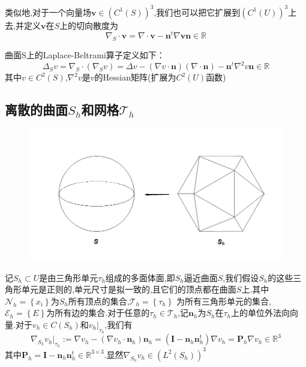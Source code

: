 \documentclass{article}
\begin{document}
类似地,对于一个向量场$\boldsymbol{v}\in(C^1(S))^3$,我们也可以把它扩展到$(C^1(U))^3$上去,并定义$\boldsymbol{v}$在$S$上的切向散度为
\begin{equation*}
\nabla_S\cdot\boldsymbol{v}=\nabla\cdot\boldsymbol{v}-\boldsymbol{n}^t\nabla\boldsymbol{v}\boldsymbol{n}\in\mathbb{R}
\end{equation*}

曲面S上的Laplace-Beltrami算子定义如下：
\begin{equation*}
\Delta_Sv=\nabla_S\cdot(\nabla_Sv)=\Delta v-(\nabla v\cdot\boldsymbol{n})(\nabla\cdot\boldsymbol{n})-\boldsymbol{n}^t\nabla^2v\boldsymbol{n}\in\mathbb{R}
\end{equation*}
其中$v\in C^2(S)$,$\nabla^2v$是$v$的Hessian矩阵(扩展为$C^2(U)$函数)
\subsection{离散的曲面$S_h$和网格$\mathcal{T}_h$}
\begin{figure}[H]
\centering
\includegraphics[scale=0.5]{./figures/picture_1.png}
\caption{}
\end{figure}
记$S_h\subset U$是由三角形单元$\tau_h$组成的多面体面,即$S_h$逼近曲面$S$,我们假设$S_h$的这些三角形单元是正则的,单元尺寸是拟一致的,且它们的顶点都在曲面$S$上.其中$\mathcal{N}_h=\left\{x_i\right\}$为$S_h$所有顶点的集合,$\mathcal{T}_h=\left\{\tau_h\right\}$ 为所有三角形单元的集合,$\mathcal{E}_h=\left\{E\right\}$为所有边的集合.对于任意的$\tau_h\in\mathcal{T}_h$,记$\boldsymbol{n}_h$为$S_h$在$\tau_h$上的单位外法向向量.对于$v_h\in C(S_h)$和$v_h|_{\tau_h}$,我们有
\begin{equation*}
\nabla_{S_h}v_h|_{\tau_h}:=\nabla v_h-(\nabla v_h\cdot\boldsymbol{n}_h)\boldsymbol{n}_h=(\boldsymbol{I}-\boldsymbol{n}_h\boldsymbol{n}^t_h)\nabla v_h=\boldsymbol{P}_h\nabla v_h\in\mathbb{R}^3
\end{equation*}
其中$\boldsymbol{P}_h=\boldsymbol{I}-\boldsymbol{n}_h\boldsymbol{n}^t_h\in\mathbb{R}^{3\times 3}$.显然$\nabla_{S_h}v_h\in(L^2(S_h))^3$
\end{document}
